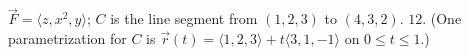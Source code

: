 {$\vec F = \langle z,x^2,y\rangle$; $C$ is the line segment from $(1,2,3)$ to $(4,3,2)$.
}
{$12$. (One parametrization for $C$ is $\vec r(t) = \langle 1,2,3\rangle+t\langle 3,1,-1\rangle$ on $0\leq t\leq 1$.)
}
